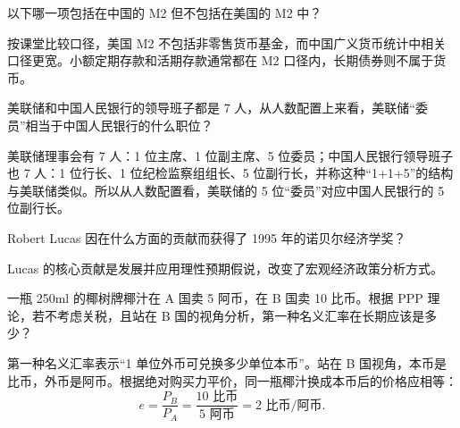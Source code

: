 \begin{question}
以下哪一项包括在中国的 M2 但不包括在美国的 M2 中？
\begin{choiceoptions}[2]
\end{choiceoptions}
\begin{solution}
按课堂比较口径，美国 M2 不包括非零售货币基金，而中国广义货币统计中相关口径更宽。小额定期存款和活期存款通常都在 M2 口径内，长期债券则不属于货币。
\end{solution}
\end{question}

\begin{question}
美联储和中国人民银行的领导班子都是 7 人，从人数配置上来看，美联储“委员”相当于中国人民银行的什么职位？
\begin{choiceoptions}[2]
\end{choiceoptions}
\begin{solution}
美联储理事会有 7 人：1 位主席、1 位副主席、5 位委员；中国人民银行领导班子也 7 人：1 位行长、1 位纪检监察组组长、5 位副行长，并称这种“1+1+5”的结构与美联储类似。所以从人数配置看，美联储的 5 位“委员”对应中国人民银行的 5 位副行长。
\end{solution}
\end{question}

\begin{question}
Robert Lucas 因在什么方面的贡献而获得了 1995 年的诺贝尔经济学奖？
\begin{choiceoptions}[1]
\end{choiceoptions}
\begin{solution}
Lucas 的核心贡献是发展并应用理性预期假说，改变了宏观经济政策分析方式。
\end{solution}
\end{question}

\begin{question}
一瓶 250ml 的椰树牌椰汁在 A 国卖 5 阿币，在 B 国卖 10 比币。根据 PPP 理论，若不考虑关税，且站在 B 国的视角分析，第一种名义汇率在长期应该是多少？
\begin{choiceoptions}[2]
\end{choiceoptions}
\begin{solution}
第一种名义汇率表示“1 单位外币可兑换多少单位本币”。站在 B 国视角，本币是比币，外币是阿币。根据绝对购买力平价，同一瓶椰汁换成本币后的价格应相等：
\[
 e=\frac{P_B}{P_A}=\frac{10\text{ 比币}}{5\text{ 阿币}}=2\text{ 比币/阿币}.
\]
\end{solution}
\end{question}

